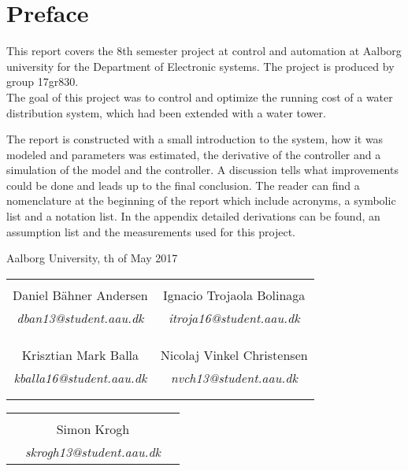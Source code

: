 \chapter*{Preface}

This report covers the 8th semester project at control and automation at Aalborg university for the Department of Electronic systems. The project is produced by group 17gr830.\\
The goal of this project was to control and optimize the running cost of a water distribution system, which had been extended with a water tower.  

The report is constructed with a small introduction to the system, how it was modeled and parameters was estimated, the derivative of the controller and a simulation of the model and the controller. A discussion tells what improvements could be done and leads up to the final conclusion. The reader can find a nomenclature at the beginning of the report which include acronyms, a symbolic list and a notation list. In the appendix detailed derivations can be found, an assumption list and the measurements used for this project.



\hfill Aalborg University, th of May 2017




\vfill

\begin{table}[H]
	\centering
		\begin{tabular}{c c }
			\underline{\phantom{mmmmmmmmmmmmmmmmmmm}}       & \underline{\phantom{mmmmmmmmmmmmmmmmmmm}} \\
			Daniel Bähner Andersen			 & Ignacio Trojaola Bolinaga  \\
			\textit{dban13@student.aau.dk} & \textit{itroja16@student.aau.dk}\\
			&\\
			&\\
			\underline{\phantom{mmmmmmmmmmmmmmmmmmm}}       & \underline{\phantom{mmmmmmmmmmmmmmmmmmm}} \\
			Krisztian Mark Balla			 & Nicolaj Vinkel Christensen \\
			\textit{kballa16@student.aau.dk} & \textit{nvch13@student.aau.dk} \\
			&\\
			&\\	
		\end{tabular}
		\begin{tabular}{c c c}
			& \underline{\phantom{mmmmmmmmmmmmmmmmmmm}} 	& \\
			& Simon Krogh					& \\
			& \textit{skrogh13@student.aau.dk}		& \\
		\end{tabular}
\end{table}